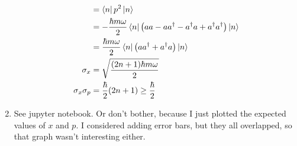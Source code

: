 \documentclass{article}
\begin{document}
\begin{enumerate}[label=(\alph*)]
\begin{align*}
                   &= \left\langle n \right\rvert p^2 \left\lvert n \right\rangle \\
                   &= -\frac{\hbar m \omega}{2} \left\langle n \right\rvert \left( aa - a a^\dag - a^\dag a + a^\dag a^\dag \right) \left\lvert n \right\rangle \\
                   &= \frac{\hbar m \omega}{2} \left\langle n \right\rvert \left(a a^\dag + a^\dag a \right) \left\lvert n \right\rangle \\
        \sigma_x &= \sqrt{ \frac{(2n+1)\hbar m \omega}{2}} \\
        \sigma_x \sigma_p &= \frac{\hbar}{2}(2n+1) \geq \frac{\hbar}{2}
\end{align*}
\item See jupyter notebook. Or don't bother, because I just plotted the expected values of $x$ and $p$. I considered adding error bars, but they all overlapped, so that graph wasn't interesting either.
\end{enumerate}




\end{document}
